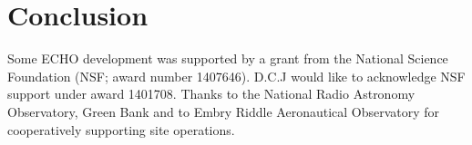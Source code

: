 \documentclass[preprint2,numberedappendix,tighten,twocolappendix]{aastex6}
\begin{document}
\section{Conclusion}


\acknowledgments
Some ECHO development was supported by a grant from the National Science Foundation (NSF; award number 1407646). D.C.J would like to acknowledge NSF support  under award 1401708.
Thanks to the National Radio Astronomy Observatory, Green Bank and to Embry Riddle Aeronautical Observatory for cooperatively supporting site operations.
\end{document}
